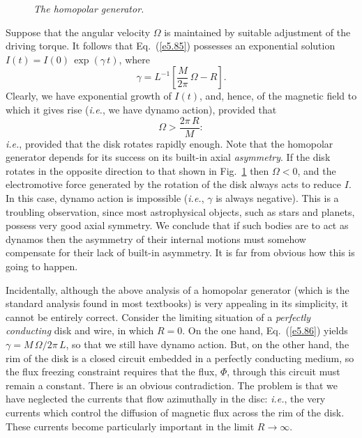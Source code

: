 \begin{figure}
\epsfysize=2.5in
\centerline{}
\caption{\em The homopolar generator.}\label{f24}
\end{figure}

Suppose that the angular velocity ${\Omega}$ is maintained by suitable adjustment
of the driving torque. It follows that Eq.~(\ref{e5.85}) possesses an
exponential solution $I(t) = I(0)\,\exp(\gamma\,t)$, where
\begin{equation}\label{e5.86}
\gamma = L^{-1}\left[\frac{M}{2\pi}\,{\Omega} - R\right].
\end{equation}
Clearly, we have exponential growth of $I(t)$, and, hence, of the magnetic
field to which it gives rise ({\em i.e.}, we have dynamo action),
provided that
\begin{equation}
{\Omega} > \frac{2\pi\,R}{M}:
\end{equation}
{\em i.e.}, provided that the disk rotates rapidly enough. Note that
the homopolar generator depends for its success on its built-in
axial  {\em asymmetry}. If the disk rotates in the opposite
direction to that shown in Fig.~\ref{f24} then ${\Omega}<0$, and the
electromotive force generated by the rotation of the disk always acts
to reduce $I$. In this case, dynamo action is impossible ({\em i.e.}, $\gamma$
is always negative). This is a troubling observation,
since most astrophysical objects, such as stars and planets, possess very
good axial symmetry. We conclude that if such bodies are to act
as dynamos then the asymmetry of their internal motions must somehow
compensate for their lack of built-in asymmetry. It is far from obvious
how this is going to happen.

Incidentally, although the above analysis of a homopolar generator 
(which is the standard analysis found in most textbooks) is
very appealing in its simplicity, it cannot be entirely correct. 
Consider the limiting situation of a {\em perfectly
conducting}\/ disk and wire, in which $R=0$. On the one hand,
Eq.~(\ref{e5.86}) yields $\gamma= M\,{\Omega}/2\pi\,L$, so that
we still have dynamo action. But, on the other hand, the rim of the disk
is a closed circuit embedded in a perfectly conducting medium, so the
flux freezing constraint requires that the flux, ${\Phi}$,
through this circuit must remain a constant. There is
an obvious contradiction. 
The problem is that we have neglected the currents
that flow azimuthally in the disc: {\em i.e.}, the very currents
which control the diffusion of magnetic flux across the rim of
the disk. These currents become particularly important
in the limit $R\rightarrow\infty$. 

